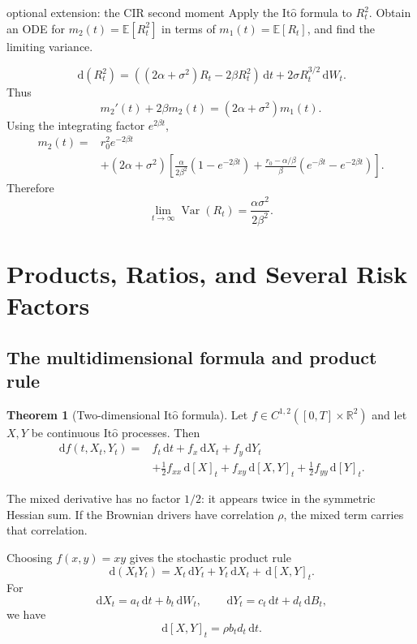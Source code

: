 \documentclass[10pt]{article}
\newcommand{\E}{\mathbb E}
\newcommand{\R}{\mathbb R}
\newcommand{\1}{\mathbf 1}
\newcommand{\dd}{\,\mathrm d}
\newcommand{\Ito}{\mathrm{It\hat{o}}}
\DeclareMathOperator{\Var}{Var}
\theoremstyle{definition}
\newtheorem{theorem}[definition]{Theorem}
\begin{document}
\begin{studentexercise}{optional extension: the CIR second moment}
Apply the \(\Ito\) formula to \(R_t^2\). Obtain an ODE for
\(m_2(t)=\E[R_t^2]\) in terms of \(m_1(t)=\E[R_t]\), and find the limiting
variance.
\end{studentexercise}
\begin{shortsolution}
\[
\dd(R_t^2)
=\left((2\alpha+\sigma^2)R_t-2\beta R_t^2\right)\dd t
+2\sigma R_t^{3/2}\dd W_t.
\]
Thus
\[
m_2'(t)+2\beta m_2(t)=(2\alpha+\sigma^2)m_1(t).
\]
Using the integrating factor \(e^{2\beta t}\),
\[
\begin{aligned}
m_2(t)
={}&r_0^2e^{-2\beta t}\\
&+(2\alpha+\sigma^2)
\left[
\frac{\alpha}{2\beta^2}(1-e^{-2\beta t})
+\frac{r_0-\alpha/\beta}{\beta}
(e^{-\beta t}-e^{-2\beta t})
\right].
\end{aligned}
\]
Therefore
\[
\lim_{t\to\infty}\Var(R_t)
=\frac{\alpha\sigma^2}{2\beta^2}.
\]
\end{shortsolution}

\section{Products, Ratios, and Several Risk Factors}

\subsection{The multidimensional formula and product rule}

\begin{theorem}[Two-dimensional \(\Ito\) formula]
Let \(f\in C^{1,2}([0,T]\times\R^2)\) and let \(X,Y\) be continuous
\(\Ito\) processes. Then
\[
\begin{aligned}
\dd f(t,X_t,Y_t)
={}&f_t\dd t+f_x\dd X_t+f_y\dd Y_t\\
&+\frac12f_{xx}\dd[X]_t
+f_{xy}\dd[X,Y]_t
+\frac12f_{yy}\dd[Y]_t.
\end{aligned}
\]
\end{theorem}

The mixed derivative has no factor \(1/2\): it appears twice in the symmetric
Hessian sum. If the Brownian drivers have correlation \(\rho\), the mixed
term carries that correlation.

Choosing \(f(x,y)=xy\) gives the stochastic product rule
\[
\boxed{
\dd(X_tY_t)
=X_t\dd Y_t+Y_t\dd X_t+\dd[X,Y]_t.}
\]
For
\[
\dd X_t=a_t\dd t+b_t\dd W_t,\qquad
\dd Y_t=c_t\dd t+d_t\dd B_t,
\]
we have
\[
\dd[X,Y]_t=\rho b_td_t\dd t.
\]
\end{document}
